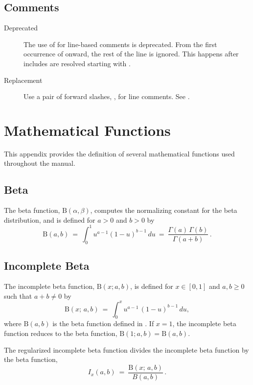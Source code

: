 \section{\code{\#} Comments}

\begin{description}
\item[Deprecated] The use of \code{\#} for line-based comments is
  deprecated.  From the first occurrence of \code{\#} onward, the rest
  of the line is ignored.  This happens after includes are resolved
  starting with .
\item[Replacement] Use a pair of forward slashes, \code{//}, for line
  comments.  See .
\end{description}


\chapter{Mathematical Functions}\label{math-functions.appendix}

This appendix provides the definition of several mathematical
functions used throughout the manual.

\section{Beta}\label{beta-appendix.section}

The beta function, $\mbox{B}(\alpha,\beta)$, computes the normalizing
constant for the beta distribution, and is defined for $a > 0$ and $b
> 0$ by
%
\[
\mbox{B}(a,b)
\ = \
\int_0^1 u^{a - 1} (1 - u)^{b - 1} \, du
\ = \
\frac{\Gamma(a) \, \Gamma(b)}{\Gamma(a+b)} \, .
\]

\section{Incomplete Beta}\label{inc-beta-appendix.section}

The incomplete beta function, $\mathrm{B}(x; a, b)$, is defined for
$x \in [0, 1]$ and $a, b \geq 0$ such that $a + b \neq 0$ by
\[
\mathrm{B}(x; \, a, b)
\ = \
\int_0^x u^{a -  1} \, (1 - u)^{b - 1} \, du,
\]
%
where $\mathrm{B}(a, b)$ is the beta function defined in
.  If $x = 1$, the incomplete beta function
reduces to the beta function, $\mathrm{B}(1; a, b) = \mathrm{B}(a,
b)$.

The regularized incomplete beta function divides the incomplete beta
function by the beta function,
\[
I_x(a, b) \ = \ \frac{\mathrm{B}(x; \, a, b)}{B(a, b)} \, .
\]




